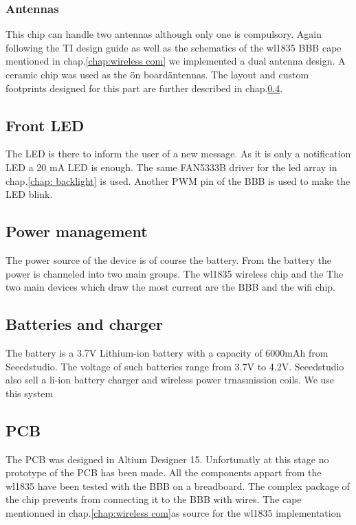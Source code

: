 \subsubsection{Antennas}
This chip can handle two antennas although only one is compulsory. Again following the TI design guide as well as the schematics of the wl1835 BBB cape mentioned in chap.\ref{chap:wireless com} we implemented a dual antenna design. A ceramic chip was used as the \"on board\" antennas. The layout and custom footprints designed for this part are further described in chap.\ref{chap:pcb}.
\subsection{Front LED}
The LED is there to inform the user of a new message. As it is only a notification LED a 20 mA LED is enough. The same FAN5333B driver for the led array in chap.\ref{chap: backlight} is used. Another PWM pin of the BBB is used to make the LED blink.
\subsection{Power management}
The power source of the device is of course the battery. From the battery the power is channeled into two main groups. The wl1835 wireless chip and the
The two main devices which draw the most current are the BBB and the wifi chip.
\subsection{Batteries and charger}
The battery is a 3.7V Lithium-ion battery with a capacity of 6000mAh from Seeedstudio. The voltage of such batteries range from 3.7V to 4.2V. Seeedstudio also sell a li-ion battery charger and wireless power trnasmission coils. We use this system
\subsection{PCB}
\label{chap:pcb}
The PCB was designed in Altium Designer 15. Unfortunatly at this stage no prototype of the PCB has been made. All the components appart from the wl1835 have been tested with the BBB on a breadboard. The complex package of the chip prevents from connecting it to the BBB with wires. The cape mentionned in chap.\ref{chap:wireless com}as source for the wl1835 implementation

